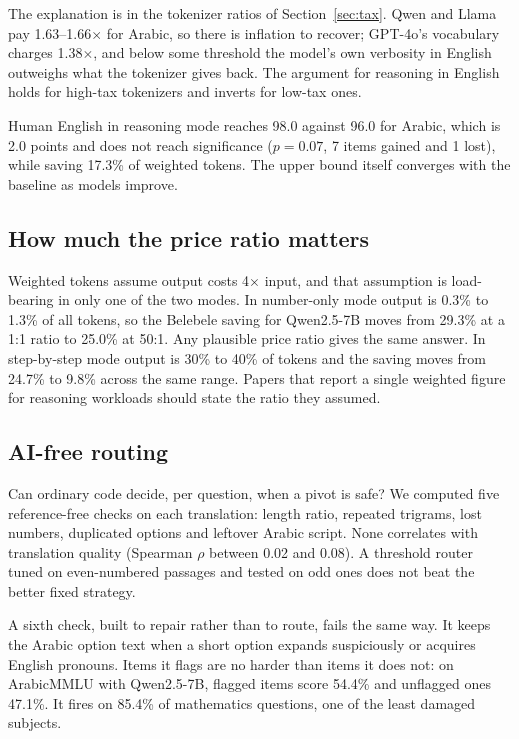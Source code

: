 \documentclass[conference,a4paper]{IEEEtran}
\begin{document}
The explanation is in the tokenizer ratios of Section~\ref{sec:tax}. Qwen and
Llama pay 1.63--1.66$\times$ for Arabic,
so there is inflation to recover; GPT-4o's vocabulary charges 1.38$\times$, and
below some threshold the model's own verbosity in English outweighs what the
tokenizer gives back. The argument for reasoning in English holds for
high-tax tokenizers and inverts for low-tax ones.

Human English in reasoning mode reaches 98.0 against 96.0 for Arabic, which is
2.0 points and does not reach significance ($p = 0.07$, 7 items gained and 1
lost), while saving 17.3\% of weighted tokens. The upper bound itself converges
with the baseline as models improve.

\subsection{How much the price ratio matters}
\label{sec:weighting}

Weighted tokens assume output costs 4$\times$ input, and that assumption is
load-bearing in only one of the two modes. In number-only mode output is 0.3\%
to 1.3\% of all tokens, so the Belebele saving for Qwen2.5-7B moves from 29.3\%
at a 1:1 ratio to 25.0\% at 50:1. Any plausible price ratio gives the same
answer. In step-by-step mode output is 30\% to 40\% of tokens and the saving
moves from 24.7\% to 9.8\% across the same range. Papers that report a single
weighted figure for reasoning workloads should state the ratio they assumed.

\subsection{AI-free routing}
\label{sec:routing}

Can ordinary code decide, per question, when a pivot is safe? We computed five
reference-free checks on each translation: length ratio, repeated trigrams,
lost numbers, duplicated options and leftover Arabic script. None correlates
with translation quality (Spearman $\rho$ between 0.02 and 0.08). A threshold
router tuned on even-numbered passages and tested on odd ones does not beat the
better fixed strategy.

A sixth check, built to repair rather than to route, fails the same way. It
keeps the Arabic option text when a short option expands suspiciously or
acquires English pronouns. Items it flags are no harder than items it does not:
on ArabicMMLU with Qwen2.5-7B, flagged items score 54.4\% and unflagged ones
47.1\%. It fires on 85.4\% of mathematics questions, one of the least damaged
subjects.
\end{document}
